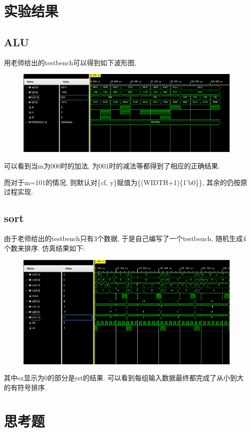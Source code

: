 \documentclass[UTF8]{article}
\begin{document}
\section{实验结果}
\subsection{ALU}
用老师给出的testbench可以得到如下波形图,
\begin{figure}[H]
	\centering
	\includegraphics[scale=0.5]{alu_sim.png}
\end{figure}\par
可以看到当m为000时的加法, 为001时的减法等都得到了相应的正确结果.\par
而对于m=101的情况, 则默认对\{cf, y\}赋值为\{(WIDTH+1)\{1'b0\}\}, 其余的仍按原过程实现.

\subsection{sort}
由于老师给出的testbench只有3个数据, 于是自己编写了一个testbench, 随机生成4个数来排序. 仿真结果如下:
\begin{figure}[H]
	\centering
	\includegraphics[scale=0.5]{sort_sim.png}
\end{figure}
其中sx显示为0的部分是rst的结果. 可以看到每组输入数据最终都完成了从小到大的有符号排序.

\section{思考题}
\end{document}
